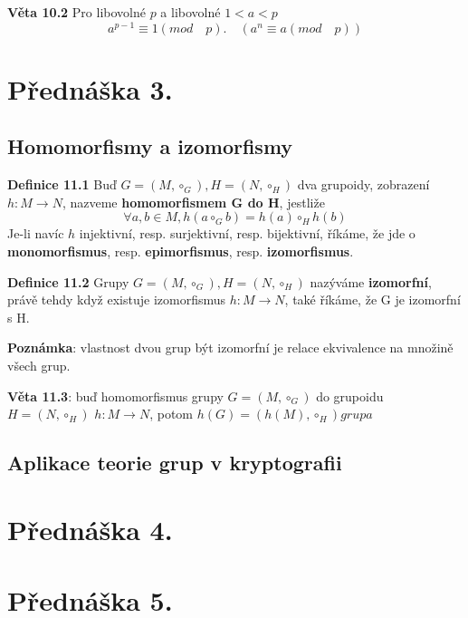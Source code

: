 \documentclass[12pt, letterpaper, twoside]{article}
\begin{document}
\textbf{Věta 10.2} Pro libovolné $p$ a libovolné $1 < a < p$
\[a^{p-1} \equiv 1 (mod \quad p). \quad (a^n \equiv a (mod \quad p))\] 

\section{Přednáška 3.}

\subsection{Homomorfismy a izomorfismy}

\textbf{Definice 11.1} Buď $G = (M, \circ_G), H = (N, \circ_H)$ dva grupoidy,
 zobrazení $h: M \to N$, nazveme \textbf{homomorfismem G do H}, jestliže
\[ \forall a,b \in M, h(a \circ_G b) = h(a) \circ_H h(b)\]
Je-li navíc $h$ injektivní, resp. surjektivní, resp. bijektivní, říkáme,
 že jde o \textbf{monomorfismus}, resp. \textbf{epimorfismus}, resp. \textbf{izomorfismus}.

\textbf{Definice 11.2} Grupy $G = (M, \circ_G), H = (N, \circ_H)$ nazýváme \textbf{izomorfní},
 právě tehdy když existuje izomorfismus $h: M \to N$, také říkáme, že G je izomorfní s H.

\textbf{Poznámka}: vlastnost dvou grup být izomorfní je relace ekvivalence na množině všech grup.

\textbf{Věta 11.3}: buď homomorfismus grupy $G = (M, \circ_G)$ do grupoidu $H = (N, \circ_H)$ $h: M \to N$,
potom $h(G) = (h(M), \circ_H) grupa$

\subsection{Aplikace teorie grup v kryptografii}

\section{Přednáška 4.}

\section{Přednáška 5.}
\end{document}
